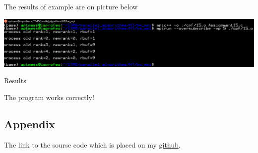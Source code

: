 \documentclass[%
12pt, %
final, %
oneside, %
onecolumn, %
centertags]{article} %
\theoremstyle{plain}
\theoremstyle{definition}
\theoremstyle{remark}
\begin{document}
The results of example are on picture below

\begin{center}
\includegraphics[scale=0.55]{15.png}

Results
\end{center}

The program works correctly!

\subsection{Appendix}

The link to the sourse code which is placed on my \href{https://github.com/aptmess/parallel_algorithms}{github}.
\end{document}
